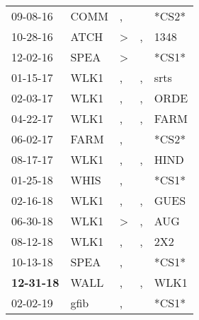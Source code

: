 \begin{supertabular}{p{0.07\textwidth}p{0.06\textwidth}p{0.02\textwidth}p{0.02\textwidth}p{0.06\textwidth}}
          09-08-16\textsuperscript{} &  COMM\textsuperscript{} &                , &               &                            *CS2* \\
          10-28-16\textsuperscript{} &  ATCH\textsuperscript{} &     \textgreater &             , &           1348\textsuperscript{} \\
          12-02-16\textsuperscript{} &  SPEA\textsuperscript{} &     \textgreater &               &                            *CS1* \\
          01-15-17\textsuperscript{} &  WLK1\textsuperscript{} &                , &             , &           srts\textsuperscript{} \\
          02-03-17\textsuperscript{} &  WLK1\textsuperscript{} &                , &             , &           ORDE\textsuperscript{} \\
          04-22-17\textsuperscript{} &  WLK1\textsuperscript{} &                , &             , &           FARM\textsuperscript{} \\
          06-02-17\textsuperscript{} &  FARM\textsuperscript{} &                , &               &                            *CS2* \\
          08-17-17\textsuperscript{} &  WLK1\textsuperscript{} &                , &             , &           HIND\textsuperscript{} \\
          01-25-18\textsuperscript{} &  WHIS\textsuperscript{} &                , &               &                            *CS1* \\
          02-16-18\textsuperscript{} &  WLK1\textsuperscript{} &                , &             , &           GUES\textsuperscript{} \\
          06-30-18\textsuperscript{} &  WLK1\textsuperscript{} &     \textgreater &             , &            AUG\textsuperscript{} \\
          08-12-18\textsuperscript{} &  WLK1\textsuperscript{} &                , &             , &            2X2\textsuperscript{} \\
          10-13-18\textsuperscript{} &  SPEA\textsuperscript{} &                , &               &                            *CS1* \\
 \textbf{12-31-18\textsuperscript{}} &  WALL\textsuperscript{} &                , &             , &           WLK1\textsuperscript{} \\
          02-02-19\textsuperscript{} &  gfib\textsuperscript{} &                , &               &                            *CS1* \\

\end{supertabular}
